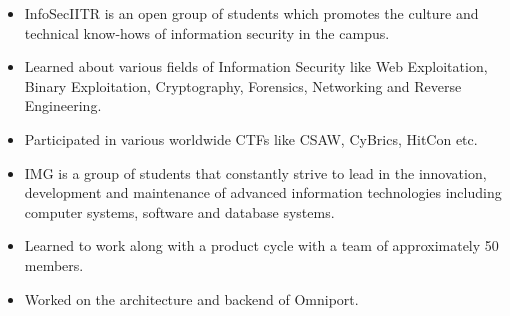 \documentclass[10pt,a4paper]{altacv}
\begin{document}



\begin{itemize}
\item InfoSecIITR is an open group of students which promotes the culture and technical know-hows of information security in the campus.
\item Learned about various fields of Information Security like Web Exploitation, Binary Exploitation, Cryptography, Forensics, Networking and Reverse Engineering.
\item Participated in various worldwide CTFs like CSAW, CyBrics, HitCon etc.
\end{itemize}
\begin{itemize}
\item IMG is a group of students that constantly strive to lead in the innovation, development and maintenance of advanced information technologies including computer systems, software and database systems.
\item Learned to work along with a product cycle with a team of approximately 50 members.
\item Worked on the architecture and backend of Omniport.
\end{itemize}
\end{document}
